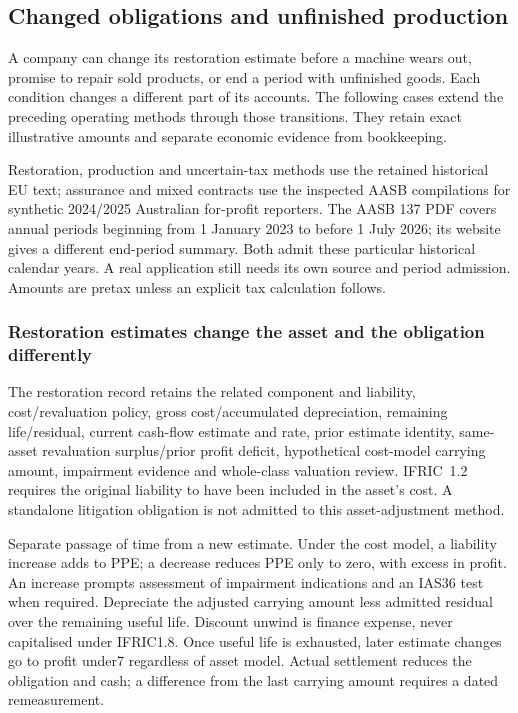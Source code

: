 \hypertarget{sec:corporate-residuals}{%
\subsection{Changed obligations and unfinished production}\label{sec:corporate-residuals}}

A company can change its restoration estimate before a machine wears out, promise to repair sold products, or end a period with unfinished goods. Each condition changes a different part of its accounts. The following cases extend the preceding operating methods through those transitions. They retain exact illustrative amounts and separate economic evidence from bookkeeping.

Restoration, production and uncertain-tax methods use the retained historical EU text; assurance and mixed contracts use the inspected AASB compilations for synthetic 2024/2025 Australian for-profit reporters. The AASB 137 PDF covers annual periods beginning from 1 January 2023 to before 1 July 2026; its website gives a different end-period summary. Both admit these particular historical calendar years. A real application still needs its own source and period admission. Amounts are pretax unless an explicit tax calculation follows.

\hypertarget{restoration-estimates-change-the-asset-and-the-obligation-differently}{%
\subsubsection{Restoration estimates change the asset and the obligation differently}\label{restoration-estimates-change-the-asset-and-the-obligation-differently}}

The restoration record retains the related component and liability, cost/revaluation policy, gross cost/accumulated depreciation, remaining life/residual, current cash-flow estimate and rate, prior estimate identity, same-asset revaluation surplus/prior profit deficit, hypothetical cost-model carrying amount, impairment evidence and whole-class valuation review. IFRIC~1.2 \citep[IFRIC~1.1--8]{eu20231803} requires the original liability to have been included in the asset's cost. A standalone litigation obligation is not admitted to this asset-adjustment method.

Separate passage of time from a new estimate. Under the cost model, a liability increase adds to PPE; a decrease reduces PPE only to zero, with excess in profit. An increase prompts assessment of impairment indications and an IAS36 test when required. Depreciate the adjusted carrying amount less admitted residual over the remaining useful life. Discount unwind is finance expense, never capitalised under IFRIC1.8. Once useful life is exhausted, later estimate changes go to profit under7 regardless of asset model. Actual settlement reduces the obligation and cash; a difference from the last carrying amount requires a dated remeasurement.

